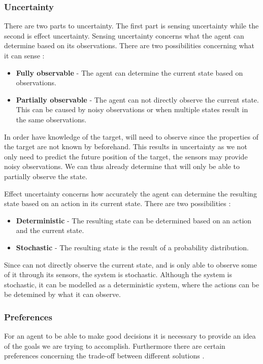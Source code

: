 \subsubsection{Uncertainty}

There are two parts to uncertainty. The first part is sensing uncertainty while
the second is effect uncertainty. Sensing uncertainty concerns what the agent
can determine based on its observations. There are two possibilities concerning
what it can sense \citep[Ch. 1.5.4]{MIBook}:
\begin{itemize}
  \item \textbf{Fully observable} - The agent can determine the current state
  based on observations.
  \item \textbf{Partially observable} - The agent can not directly observe the
  current state. This can be caused by noisy observations or when multiple
  states result in the same observations.
\end{itemize}

In order have knowledge of the target, \name will need to observe since the
properties of the target are not known by \name beforehand. This results in
uncertainty as we not only need to predict the future position of the target,
the sensors may provide noisy observations. We can thus already determine that
\name will only be able to partially observe the state.\nl

Effect uncertainty concerns how accurately the agent can determine the resulting
state based on an action in its current state. There are two possibilities
\citep[Ch. 1.5.4]{MIBook}:
\begin{itemize}
  \item \textbf{Deterministic} - The resulting state can be determined based on
  an action and the current state.
  \item \textbf{Stochastic} - The resulting state is the result of a probability
  distribution.
\end{itemize}

Since \name can not directly observe the current state, and is only able
to observe some of it through its sensors, the system is stochastic. Although
the system is stochastic, it can be modelled as a deterministic system, where
the actions can be be detemined by what it can observe.
 
\subsubsection{Preferences}
For an agent to be able to make good decisions it is necessary to provide an
idea of the goals we are trying to accomplish. Furthermore there are certain
preferences concerning the trade-off between different solutions \citep[Ch.
1.5.5]{MIBook}.

